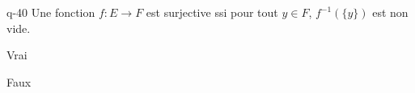 \begin{truefalse}{q-40}
Une fonction $f : E\to F$ est surjective ssi pour tout $y\in F$, $f^{-1}(\{y\})$ est non vide.
\item* Vrai
\item Faux
\end{truefalse}

